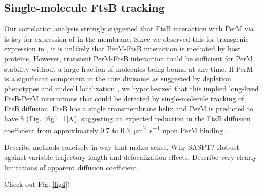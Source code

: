 \documentclass[pdflatex,sn-basic]{sn-jnl}%
\begin{document}
\subsection{Single-molecule FtsB tracking}

Our correlation analysis strongly suggested that FtsB interaction with PerM via \ftsbH{} is key for expression of \permN{} in the membrane. Since we observed this for transgenic expression in \ec{}, it is unlikely that PerM-FtsB interaction is mediated by host proteins. However, transient PerM-FtsB interaction could be sufficient for PerM stability without a large fraction of molecules being bound at any time. If PerM is a significant component in the core \mtb{} divisome as suggested by depletion phenotypes and midcell localization \citep{goodsmithDisruptionTuberculosisMembrane2015, wangPersistentMycobacteriumTuberculosis2019}, we hypothesized that this implied long-lived FtsB-PerM interactions that could be detected by single-molecule tracking of FtsB diffusion. FtsB has a single transmembrane helix and PerM is predicted to have 8 (Fig.~\ref{fig1_1}A), suggesting an expected reduction in the FtsB diffusion coefficient from approximately 0.7 to \qty{0.3}{\square\um\per\s} upon PerM binding \citep{lucenaMicrodomainFormationGeneral2018}.

Describe methods concisely in way that makes sense. Why SASPT?
Robust against variable trajectory length and defocalization effects.
Describe very clearly limitations of apparent diffusion coefficient.

\loremipsum{}

Check out Fig. \ref{fig4}!
\end{document}

